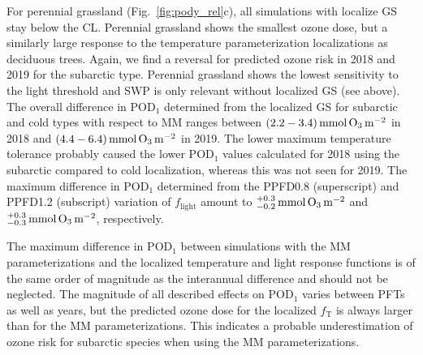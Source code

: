 \documentclass[bg, manuscript]{copernicus}
\begin{document}
For perennial grassland (Fig.~\ref{fig:pody_rel}c), all simulations with localize GS stay below the CL. Perennial grassland shows the smallest ozone dose, but a similarly large response to the temperature parameterization localizations as deciduous trees. Again, we find a reversal for predicted ozone risk in 2018 and 2019 for the subarctic type. Perennial grassland shows the lowest sensitivity to the light threshold and SWP is only relevant without localized GS (see above). The overall difference in $\mathrm{POD_1}$ determined from the localized GS for subarctic and cold types with respect to MM ranges between $(2.2-3.4)\,\unit{mmol\,\chem{O_3}\,m^{-2}}$ in 2018 and $(4.4-6.4)\,\unit{mmol\,\chem{O_3}\,m^{-2}}$ in 2019. The lower maximum temperature tolerance probably caused the lower $\mathrm{POD_1}$ values calculated for 2018 using the subarctic compared to cold localization, whereas this was not seen for 2019. The maximum difference in $\mathrm{POD_1}$ determined from the PPFD0.8 (superscript) and PPFD1.2 (subscript) variation of $f_\mathrm{light}$ amount to $^{+0.3}_{-0.2}\,\unit{mmol\,\chem{O_3}\,m^{-2}}$ and $^{+0.3}_{-0.3}\,\unit{mmol\,\chem{O_3}\,m^{-2}}$, respectively.

The maximum difference in $\mathrm{POD_1}$ between simulations with the MM parameterizations and the localized temperature and light response functions is of the same order of magnitude as the interannual difference and should not be neglected.
The magnitude of all described effects on $\mathrm{POD_1}$ varies between PFTs as well as years, but the predicted ozone dose for the localized $f_\mathrm{T}$ is always larger than for the MM parameterizations. This indicates a probable underestimation of ozone risk for subarctic species when using the MM parameterizations.
\end{document}
